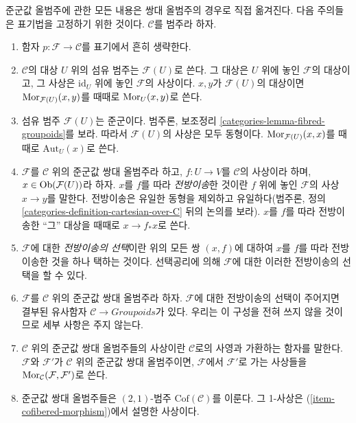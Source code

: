 \begin{remarks}
\label{remarks-cofibered-groupoids}
준군값 올범주에 관한 모든 내용은 쌍대 올범주의 경우로 직접 옮겨진다.
다음 주의들은 표기법을 고정하기 위한 것이다.
$\mathcal{C}$를 범주라 하자.
\begin{enumerate}
\item 함자 $p: \mathcal{F} \to \mathcal{C}$를 표기에서 흔히 생략한다.
\item $\mathcal{C}$의 대상 $U$ 위의 섬유 범주는
$\mathcal{F}(U)$로 쓴다. 그 대상은 $U$ 위에 놓인
$\mathcal{F}$의 대상이고, 그 사상은 $\text{id}_U$ 위에 놓인
$\mathcal{F}$의 사상이다. $x, y$가 $\mathcal{F}(U)$의 대상이면
$\mathop{\mathrm{Mor}}\nolimits_{\mathcal{F}(U)}(x, y)$를 때때로 $\mathop{\mathrm{Mor}}\nolimits_U(x, y)$로 쓴다.
\item 섬유 범주 $\mathcal{F}(U)$는 준군이다. 범주론, 보조정리
\ref{categories-lemma-fibred-groupoids}를 보라.
따라서 $\mathcal{F}(U)$의 사상은 모두 동형이다.
$\mathop{\mathrm{Mor}}\nolimits_{\mathcal{F}(U)}(x, x)$를 때때로 $\text{Aut}_U(x)$로 쓴다.
\item
\label{item-pushforward}
$\mathcal{F}$를 $\mathcal{C}$ 위의 준군값 쌍대 올범주라 하고,
$f: U \to V$를 $\mathcal{C}$의 사상이라 하며,
$x \in \mathop{\mathrm{Ob}}\nolimits(\mathcal{F}(U))$라 하자.
$x$를 $f$를 따라 {\it 전방이송}한 것이란 $f$ 위에 놓인
$\mathcal{F}$의 사상 $x \to y$를 말한다. 전방이송은 유일한 동형을
제외하고 유일하다(범주론, 정의
\ref{categories-definition-cartesian-over-C} 뒤의 논의를 보라).
$x$를 $f$를 따라 전방이송한 “그” 대상을 때때로
$x \to f_*x$로 쓴다.
\item $\mathcal{F}$에 대한 {\it 전방이송의 선택}이란 위의 모든 쌍
$(x, f)$에 대하여 $x$를 $f$를 따라 전방이송한 것을 하나 택하는
것이다. 선택공리에 의해 $\mathcal{F}$에 대한 이러한 전방이송의
선택을 할 수 있다.
\item $\mathcal{F}$를 $\mathcal{C}$ 위의 준군값 쌍대 올범주라 하자.
$\mathcal{F}$에 대한 전방이송의 선택이 주어지면 결부된 유사함자
$\mathcal{C} \to \textit{Groupoids}$가 있다. 우리는 이 구성을
전혀 쓰지 않을 것이므로 세부 사항은 주지 않는다.
\item
\label{item-cofibered-morphism}
$\mathcal{C}$ 위의 준군값 쌍대 올범주들의 사상이란
$\mathcal{C}$로의 사영과 가환하는 함자를 말한다.
$\mathcal{F}$와 $\mathcal{F}'$가 $\mathcal{C}$ 위의 준군값
쌍대 올범주이면, $\mathcal{F}$에서 $\mathcal{F}'$로 가는 사상들을
$\mathop{\mathrm{Mor}}\nolimits_\mathcal{C}(\mathcal{F}, \mathcal{F}')$로 쓴다.
\item
\label{item-definition-cofibered-groupoids-2-category}
준군값 쌍대 올범주들은 $(2, 1)$-범주
$\text{Cof}(\mathcal{C})$를 이룬다. 그 1-사상은
(\ref{item-cofibered-morphism})에서 설명한 사상이다.

\end{enumerate}
\end{remarks}
